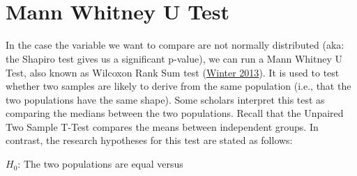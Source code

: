 \documentclass[
]{svmono}
\newenvironment{Shaded}{\begin{snugshade}}{\end{snugshade}}
\newcommand{\AttributeTok}[1]{\textcolor[rgb]{0.13,0.29,0.53}{#1}}
\newcommand{\CommentTok}[1]{\textcolor[rgb]{0.56,0.35,0.01}{\textit{#1}}}
\newcommand{\DecValTok}[1]{\textcolor[rgb]{0.00,0.00,0.81}{#1}}
\newcommand{\FunctionTok}[1]{\textcolor[rgb]{0.13,0.29,0.53}{\textbf{#1}}}
\newcommand{\NormalTok}[1]{#1}
\newcommand{\OtherTok}[1]{\textcolor[rgb]{0.56,0.35,0.01}{#1}}
\newcommand{\SpecialCharTok}[1]{\textcolor[rgb]{0.81,0.36,0.00}{\textbf{#1}}}
\newcommand{\StringTok}[1]{\textcolor[rgb]{0.31,0.60,0.02}{#1}}
\begin{document}
\begin{Shaded}
\end{Shaded}

~

~
~

\hypertarget{mann-whitney-u-test}{%
\section{Mann Whitney U Test}\label{mann-whitney-u-test}}

In the case the variable we want to compare are not normally distributed
(aka: the Shapiro test gives us a significant p-value), we can run a
Mann Whitney U Test, also known as Wilcoxon Rank Sum test (\protect\hyperlink{ref-dewinter}{Winter 2013}).
It is used to test whether two samples are likely to derive from the
same population (i.e., that the two populations have the same shape).
Some scholars interpret this test as comparing the medians between the
two populations. Recall that the Unpaired Two Sample T-Test compares the
means between independent groups. In contrast, the research hypotheses
for this test are stated as follows:

\(H_0\): The two populations are equal versus
\end{document}
